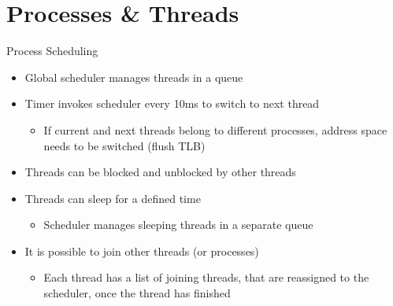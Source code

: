 \section{Processes \& Threads}

\begin{frame}{Process Scheduling}
	\begin{itemize}
		\setlength\itemsep{1em}
		\item Global scheduler manages threads in a queue
		\item Timer invokes scheduler every 10ms to switch to next thread
		\begin{itemize}
			\item If current and next threads belong to different processes, address space needs to be switched (flush TLB)
		\end{itemize}
		\item Threads can be blocked and unblocked by other threads
		\item Threads can sleep for a defined time
		\begin{itemize}
			\item Scheduler manages sleeping threads in a separate queue
		\end{itemize}
		\item It is possible to join other threads (or processes)
		\begin{itemize}
			\item Each thread has a list of joining threads, that are reassigned to the scheduler, once the thread has finished
		\end{itemize}
	\end{itemize}	
\end{frame}
